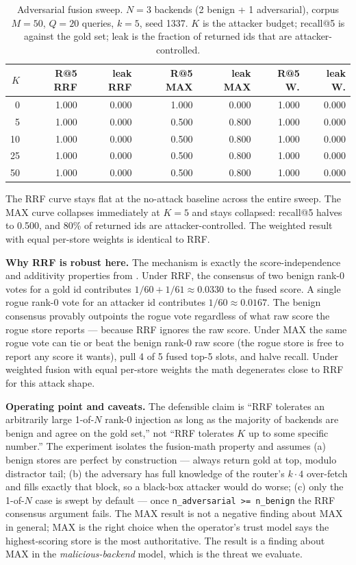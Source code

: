 \documentclass[11pt,letterpaper,twocolumn]{article}
\begin{document}
\begin{table}[t]
\centering
\caption{Adversarial fusion sweep. $N=3$ backends (2 benign + 1 adversarial), corpus $M=50$, $Q=20$ queries, $k=5$, seed 1337. $K$ is the attacker budget; recall@5 is against the gold set; leak is the fraction of returned ids that are attacker-controlled.}
\label{tab:adversarial}
\small
\begin{tabular}{rrrrrrr}
\toprule
$K$ & R@5 RRF & leak RRF & R@5 MAX & leak MAX & R@5 W. & leak W. \\
\midrule
0  & 1.000 & 0.000 & 1.000 & 0.000 & 1.000 & 0.000 \\
5  & 1.000 & 0.000 & 0.500 & 0.800 & 1.000 & 0.000 \\
10 & 1.000 & 0.000 & 0.500 & 0.800 & 1.000 & 0.000 \\
25 & 1.000 & 0.000 & 0.500 & 0.800 & 1.000 & 0.000 \\
50 & 1.000 & 0.000 & 0.500 & 0.800 & 1.000 & 0.000 \\
\bottomrule
\end{tabular}
\end{table}

The RRF curve stays flat at the no-attack baseline across the entire sweep. The MAX curve collapses immediately at $K=5$ and stays collapsed: recall@5 halves to 0.500, and 80\% of returned ids are attacker-controlled. The weighted result with equal per-store weights is identical to RRF.

\textbf{Why RRF is robust here.} The mechanism is exactly the score-independence and additivity properties from . Under RRF, the consensus of two benign rank-0 votes for a gold id contributes $1/60 + 1/61 \approx 0.0330$ to the fused score. A single rogue rank-0 vote for an attacker id contributes $1/60 \approx 0.0167$. The benign consensus provably outpoints the rogue vote regardless of what raw score the rogue store reports --- because RRF ignores the raw score. Under MAX the same rogue vote can tie or beat the benign rank-0 raw score (the rogue store is free to report any score it wants), pull 4 of 5 fused top-5 slots, and halve recall. Under weighted fusion with equal per-store weights the math degenerates close to RRF for this attack shape.

\textbf{Operating point and caveats.} The defensible claim is ``RRF tolerates an arbitrarily large 1-of-$N$ rank-0 injection as long as the majority of backends are benign and agree on the gold set,'' not ``RRF tolerates $K$ up to some specific number.'' The experiment isolates the fusion-math property and assumes (a) benign stores are perfect by construction --- always return gold at top, modulo distractor tail; (b) the adversary has full knowledge of the router's $k \cdot 4$ over-fetch and fills exactly that block, so a black-box attacker would do worse; (c) only the 1-of-$N$ case is swept by default --- once \texttt{n\_adversarial >= n\_benign} the RRF consensus argument fails. The MAX result is not a negative finding about MAX in general; MAX is the right choice when the operator's trust model says the highest-scoring store is the most authoritative. The result is a finding about MAX in the \emph{malicious-backend} model, which is the threat we evaluate.
\end{document}
